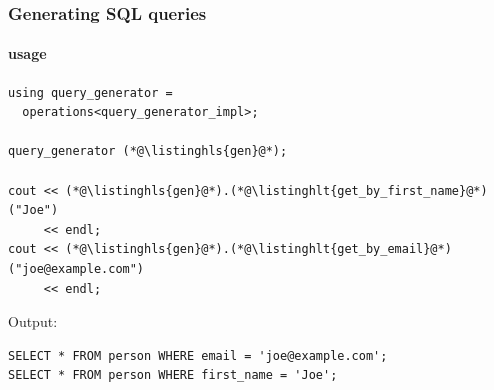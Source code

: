 \documentclass[compress,table,xcolor=table]{beamer}
\begin{document}
\begin{frame}[fragile]
  \frametitle{Generating SQL queries}
  \framesubtitle{usage}
  \begin{lstlisting}[language=c++2x,basicstyle=\small\ttfamily]
using query_generator =
  operations<query_generator_impl>;

query_generator (*@\listinghls{gen}@*);

cout << (*@\listinghls{gen}@*).(*@\listinghlt{get_by_first_name}@*)("Joe")
     << endl;
cout << (*@\listinghls{gen}@*).(*@\listinghlt{get_by_email}@*)("joe@example.com")
     << endl;
  \end{lstlisting}
  Output:
  \begin{verbatim}
SELECT * FROM person WHERE email = 'joe@example.com';
SELECT * FROM person WHERE first_name = 'Joe';
  \end{verbatim}
\end{frame}
\end{document}
